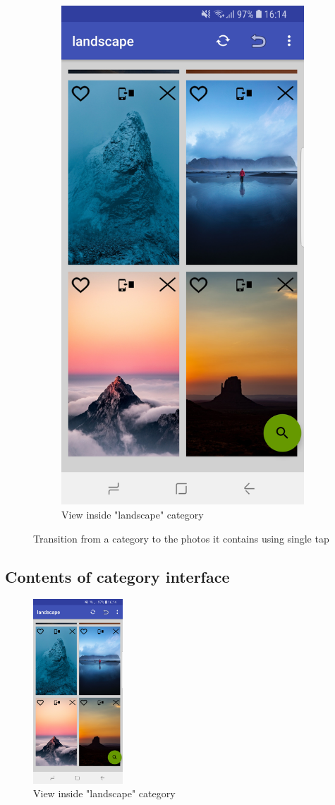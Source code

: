\documentclass[version=last,fontsize=13pt]{scrartcl}
\begin{document}
\begin{figure}
\begin{subfigure}{.5\textwidth}
  \includegraphics[width=.45\linewidth]{imgs/Inside_category.jpg}
  \caption{View inside "landscape" category}
  \label{fig:sub2}
\end{subfigure}
\caption{Transition from a category to the photos it contains using single tap}
\label{fig:transition}
\end{figure}

\vspace{2cm}

\subsection{Contents of category interface}

\begin{figure}
  \centering
  \includegraphics[width=0.3\textwidth]{imgs/Inside_category.jpg}
  \caption{View inside "landscape" category}
\end{figure}
\end{document}
